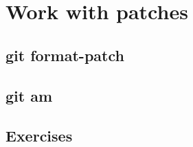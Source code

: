 \section{Work with patches}
\begin{frame}[fragile]
    \slidetitle
\end{frame}

\subsection{git format-patch}
\begin{frame}[fragile]
    \subslidetitle
\end{frame}

\subsection{git am}
\begin{frame}[fragile]
    \subslidetitle
\end{frame}

\subsection{Exercises}
\begin{frame}[fragile]
  \subslidetitle
\end{frame}
